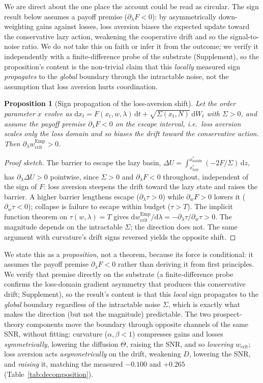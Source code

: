 \documentclass[letterpaper]{article} %
\theoremstyle{plain}
\newtheorem{proposition}{Proposition}
\newcommand{\wcrit}{w_{\mathrm{crit}}}
\begin{document}
We are direct about the one place the account could be read as circular. The sign result below
assumes a payoff premise ($\partial_\lambda F<0$): by asymmetrically down-weighting gains against
losses, loss aversion biases the expected update toward the conservative lazy action, weakening the
cooperative drift and so the signal-to-noise ratio. We do \emph{not} take this on faith or
infer it from the outcome; we verify it independently with a finite-difference probe of the
substrate (Supplement), so the proposition's content is the non-trivial claim that this
\emph{locally} measured sign \emph{propagates} to the \emph{global} boundary through the intractable
noise, not the assumption that loss aversion hurts coordination.

\begin{proposition}[Sign propagation of the loss-aversion shift]\label{thm:sign}
Let the order parameter $x$ evolve as $\mathrm{d}x_t=F(x_t,w,\lambda)\,\mathrm{d}t+
\sqrt{\Sigma(x_t,N)}\,\mathrm{d}W_t$ with $\Sigma>0$, and \emph{assume the payoff premise}
$\partial_\lambda F<0$ on the escape interval, i.e.\ loss aversion scales only the loss domain
and so biases the drift toward the conservative action. Then $\partial_\lambda \wcrit^{\mathrm{Emp}}>0$.
\end{proposition}
\begin{proof}[Proof sketch]
The barrier to escape the lazy basin, $\Delta U=\int_{x^\ast_{\mathrm{lazy}}}^{x^\ast_{\mathrm{saddle}}}(-2F/\Sigma)\,\mathrm{d}z$, has $\partial_\lambda\Delta U>0$
pointwise, since $\Sigma>0$ and $\partial_\lambda F<0$ throughout, independent of the sign of
$F$: loss aversion steepens the drift toward the lazy state and raises the barrier. A higher
barrier lengthens escape ($\partial_\lambda\tau>0$) while $\partial_w F>0$ lowers it
($\partial_w\tau<0$); collapse is failure to escape within budget ($\tau>T$). The implicit
function theorem on $\tau(w,\lambda)=T$ gives $\mathrm{d}\wcrit^{\mathrm{Emp}}/
\mathrm{d}\lambda=-\partial_\lambda\tau/\partial_w\tau>0$. The magnitude depends on the
intractable $\Sigma$; the direction does not. The same argument with curvature's drift signs
reversed yields the opposite shift.
\end{proof}

We state this as a \emph{proposition}, not a theorem, because its force is conditional: it assumes
the payoff premise $\partial_\lambda F<0$ rather than deriving it from first principles. We verify
that premise directly on the substrate (a finite-difference probe confirms the loss-domain gradient
asymmetry that produces this conservative drift; Supplement), so the result's content is that this \emph{local}
sign propagates to the \emph{global} boundary regardless of the intractable noise $\Sigma$, which
is exactly what makes the direction (but not the magnitude) predictable. The two prospect-theory
components move the boundary through opposite channels of the same SNR, without fitting: curvature
($\alpha,\beta<1$) compresses gains and losses \emph{symmetrically}, lowering the diffusion
$\Theta$, raising the SNR, and so \emph{lowering} $\wcrit$; loss aversion acts
\emph{asymmetrically} on the drift, weakening $D$, lowering the SNR, and \emph{raising} it, matching
the measured $-0.100$ and $+0.265$ (Table~\ref{tab:decomposition}).
\end{document}
